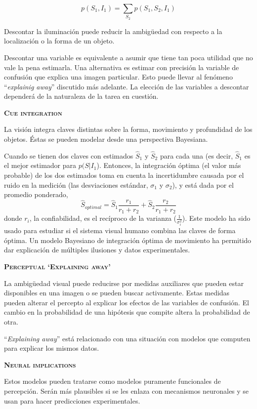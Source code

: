 \documentclass[a4paper,12pt]{article}
\begin{document}
$$
p(S_{1}, I_{1}) =
\sum_{S_{2}}p(S_{1}, S_{2}, I_{1})
$$

Descontar la iluminación puede reducir la ambigüedad con respecto a la localización o la forma de un objeto.

Descontar una variable es equivalente a asumir que tiene tan poca utilidad que no vale la pena estimarla. Una alternativa es estimar con precisión la variable de confusión que explica una imagen particular. Esto puede llevar al fenómeno ``{\itshape explainig away}'' discutido más adelante. La elección de las variables a descontar dependerá de la naturaleza de la tarea en cuestión.

{\scshape\bfseries Cue integration}

La visión integra claves distintas sobre la forma, movimiento y profundidad de los objetos. Éstas se pueden modelar desde una perspectiva Bayesiana.

Cuando se tienen dos claves con estimados $\hat S_{1}$ y $\hat S_{2}$ para cada una (es decir, $\hat S_{1}$ es el mejor estimador para $p(S|I_{1}$). Entonces, la integración óptima (el valor más probable) de los dos estimados toma en cuenta la incertidumbre causada por el ruido en la medición (las desviaciones estándar, $\sigma_{1}$ y $\sigma_{2}$), y está dada por el promedio ponderado,
$$
\hat S_{optimal}
=
\hat S_{1}
\frac{
	r_{1}
}{
	r_{1}+r_{2}
}
+
\hat S_{2}
\frac{
	r_{2}
}{
	r_{1}+r_{2}
}
$$
donde $r_{i}$, la confiabilidad, es el recíproco de la varianza ($\frac{1}{\sigma_{i}^{2}}$). Este modelo ha sido usado para estudiar si el sistema visual humano combina las claves de forma óptima. Un modelo Bayesiano de integración óptima de movimiento ha permitido dar explicación de múltiples ilusiones y datos experimentales.

{\scshape\bfseries Perceptual `Explaining away'}

La ambigüedad visual puede reducirse por medidas auxiliares que pueden estar disponibles en una imagen o se pueden buscar activamente. Estas medidas pueden alterar el percepto al explicar los efectos de las variables de confusión. El cambio en la probabilidad de una hipótesis que compite altera la probabilidad de otra.

``{\itshape Explaining away}'' está relacionado con una situación con modelos que computen para explicar los mismos datos.

{\scshape\bfseries Neural implications}

Estos modelos pueden tratarse como modelos puramente funcionales de percepción. Serán más plausibles si se les enlaza con mecanismos neuronales y se usan para hacer predicciones experimentales.
\end{document}
